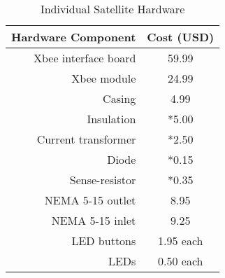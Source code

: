 \begin{table}[htbp]
  \centering
  \caption{Individual Satellite Hardware}
    \begin{tabular}{rc}
    \toprule
    \multicolumn{1}{c}{\textbf{Hardware Component}} & \textbf{Cost (USD)} \\
    \midrule
    Xbee interface board & 59.99 \\
    Xbee module & 24.99 \\
    Casing & 4.99 \\
    Insulation & *5.00 \\
    Current transformer & *2.50 \\
    Diode & *0.15 \\
    Sense-resistor & *0.35 \\
    NEMA 5-15 outlet & 8.95 \\
    NEMA 5-15 inlet & 9.25 \\
    LED buttons & 1.95 each \\
    LEDs  & 0.50 each \\
    \bottomrule
    \end{tabular}%
  \label{tab:addlabel}%
\end{table}%

